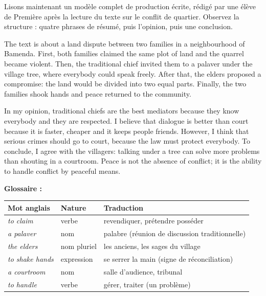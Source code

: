 \documentclass[11pt]{article}
\newcommand{\eng}[1]{\ifmmode\text{\textit{#1}}\else\begingroup\selectlanguage{english}\itshape #1\endgroup\fi}
\begin{document}
Lisons maintenant un modèle complet de production écrite, rédigé par une élève de Première après la lecture du texte sur le conflit de quartier. Observez la structure : quatre phrases de résumé, puis l'opinion, puis une conclusion.

\begin{textebox}
The text is about a land dispute between two families in a neighbourhood of Bamenda. First, both families claimed the same plot of land and the quarrel became violent. Then, the traditional chief invited them to a palaver under the village tree, where everybody could speak freely. After that, the elders proposed a compromise: the land would be divided into two equal parts. Finally, the two families shook hands and peace returned to the community.

In my opinion, traditional chiefs are the best mediators because they know everybody and they are respected. I believe that dialogue is better than court because it is faster, cheaper and it keeps people friends. However, I think that serious crimes should go to court, because the law must protect everybody. To conclude, I agree with the villagers: talking under a tree can solve more problems than shouting in a courtroom. Peace is not the absence of conflict; it is the ability to handle conflict by peaceful means.
\end{textebox}

\textbf{Glossaire :}

\begin{center}
\begin{tabularx}{\linewidth}{|l|l|X|}\hline
\rowcolor{popblueL} \textbf{Mot anglais} & \textbf{Nature} & \textbf{Traduction} \\ \hline
\eng{to claim} & verbe & revendiquer, prétendre posséder \\ \hline
\eng{a palaver} & nom & palabre (réunion de discussion traditionnelle) \\ \hline
\eng{the elders} & nom pluriel & les anciens, les sages du village \\ \hline
\eng{to shake hands} & expression & se serrer la main (signe de réconciliation) \\ \hline
\eng{a courtroom} & nom & salle d'audience, tribunal \\ \hline
\eng{to handle} & verbe & gérer, traiter (un problème) \\ \hline
\end{tabularx}
\end{center}
\end{document}
